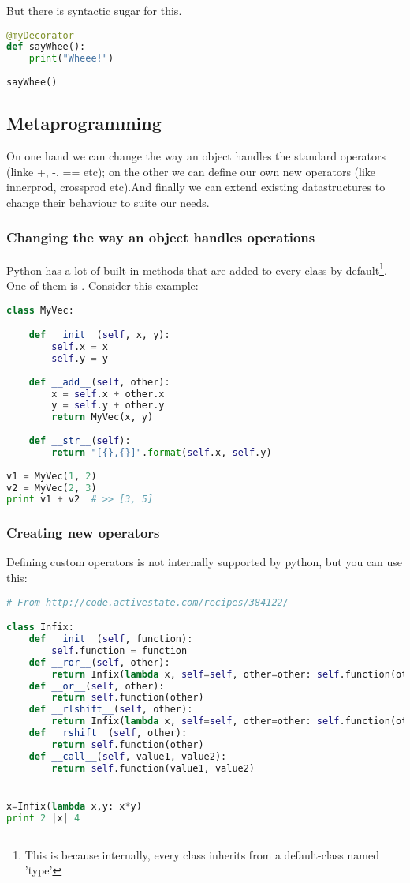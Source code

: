 But there is syntactic sugar for this. 
\begin{lstlisting}[language=python]
@myDecorator
def sayWhee():
    print("Wheee!")
    
sayWhee()
\end{lstlisting}


\subsection{Metaprogramming}

On one hand we can change the way an object handles the standard operators (linke +, -, == etc); on the other we can define our own new operators (like innerprod, crossprod etc).And finally we can extend existing datastructures to change their behaviour to suite our needs. 

\subsubsection{Changing the way an object handles operations}

Python has a lot of built-in methods that are added to every class by default\footnote{This is because internally, every class inherits from a default-class named 'type'}. One of them is .
Consider this example: 

\begin{lstlisting}[language=python]
class MyVec:

	def __init__(self, x, y):
		self.x = x
		self.y = y
		
	def __add__(self, other):
		x = self.x + other.x
		y = self.y + other.y
		return MyVec(x, y)
		
	def __str__(self):
		return "[{},{}]".format(self.x, self.y)
		
v1 = MyVec(1, 2)
v2 = MyVec(2, 3)
print v1 + v2  # >> [3, 5]
\end{lstlisting}


\subsubsection{Creating new operators}

Defining custom operators is not internally supported by python, but you can use this: 

\begin{lstlisting}[language=python]
# From http://code.activestate.com/recipes/384122/

class Infix:
    def __init__(self, function):
        self.function = function
    def __ror__(self, other):
        return Infix(lambda x, self=self, other=other: self.function(other, x))
    def __or__(self, other):
        return self.function(other)
    def __rlshift__(self, other):
        return Infix(lambda x, self=self, other=other: self.function(other, x))
    def __rshift__(self, other):
        return self.function(other)
    def __call__(self, value1, value2):
        return self.function(value1, value2)


x=Infix(lambda x,y: x*y)
print 2 |x| 4
\end{lstlisting}

